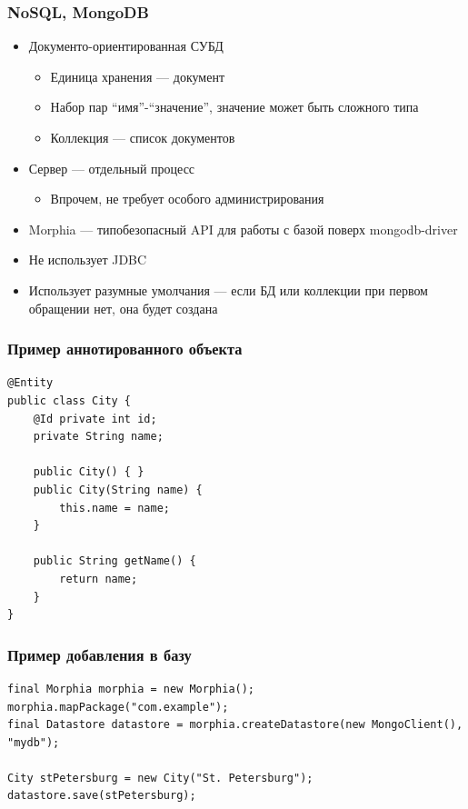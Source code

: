 \documentclass[xetex,mathserif,serif]{beamer}
\begin{document}
\begin{frame}
\begin{columns}
\begin{column}{0.25\textwidth}
\begin{center}
				\end{center}
			\end{column}
		\end{columns}
	\end{frame}

	\begin{frame}
		\frametitle{NoSQL, MongoDB}
		\begin{itemize}
			\item Документо-ориентированная СУБД
			\begin{itemize}
				\item Единица хранения --- документ
				\item Набор пар ``имя''-``значение'', значение может быть сложного типа
				\item Коллекция --- список документов
			\end{itemize}
			\item Сервер --- отдельный процесс
			\begin{itemize}
				\item Впрочем, не требует особого администрирования
			\end{itemize}
			\item Morphia --- типобезопасный API для работы с базой поверх mongodb-driver
			\item Не использует JDBC
			\item Использует разумные умолчания --- если БД или коллекции при первом обращении нет, она будет создана
		\end{itemize}
	\end{frame}

	\begin{frame}[fragile]
		\frametitle{Пример аннотированного объекта}
		\begin{footnotesize}
			\begin{verbatim}
@Entity
public class City {
    @Id private int id;
    private String name;

    public City() { }
    public City(String name) {
        this.name = name;
    }

    public String getName() {
        return name;
    }
}
			\end{verbatim}
		\end{footnotesize}
	\end{frame}

	\begin{frame}[fragile]
		\frametitle{Пример добавления в базу}
		\begin{footnotesize}
			\begin{verbatim}
final Morphia morphia = new Morphia();
morphia.mapPackage("com.example");
final Datastore datastore = morphia.createDatastore(new MongoClient(), "mydb");

City stPetersburg = new City("St. Petersburg");
datastore.save(stPetersburg);
			\end{verbatim}
		\end{footnotesize}
	\end{frame}
\end{document}
